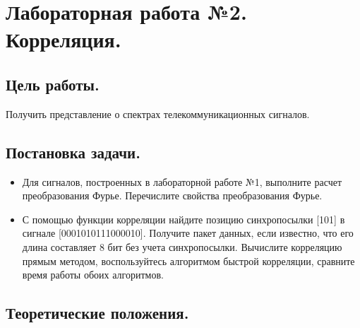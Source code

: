 \documentclass[a4paper,14pt]{extarticle}
\begin{document}
\newpage %


\section{Лабораторная работа №2. Корреляция.}
\subsection{Цель работы.}
Получить представление о спектрах телекоммуникационных сигналов.

\subsection{Постановка задачи.}
\begin{itemize}
\item Для сигналов, построенных в лабораторной работе №1, выполните расчет преобразования Фурье. Перечислите свойства
преобразования Фурье.
\item С помощью функции корреляции найдите позицию синхропосылки [101] в сигнале [0001010111000010]. Получите пакет
данных, если известно, что его длина составляет 8 бит без
учета синхропосылки. Вычислите корреляцию прямым методом, воспользуйтесь алгоритмом быстрой корреляции, сравните время работы обоих алгоритмов.
\end{itemize}

\subsection{Теоретические положения.}
\end{document}
